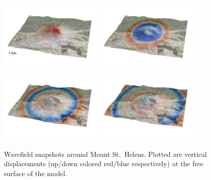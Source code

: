 \documentclass[referee,extra]{gji}
\begin{document}
\begin{figure}
\begin{center}
\includegraphics[width=0.45\textwidth]{./images/mount2.jpg}
\includegraphics[width=0.45\textwidth]{./images/mount3.jpg}
\includegraphics[width=0.45\textwidth]{./images/mount4.jpg}
\includegraphics[width=0.45\textwidth]{./images/mount5.jpg}
\end{center}
\caption{Wavefield snapshots around Mount St.~Helens. Plotted are vertical displacements (up/down colored red/blue respectively) at the free surface of the model.
}
\label{figure:mountsnapshots}
\end{figure}
\end{document}
